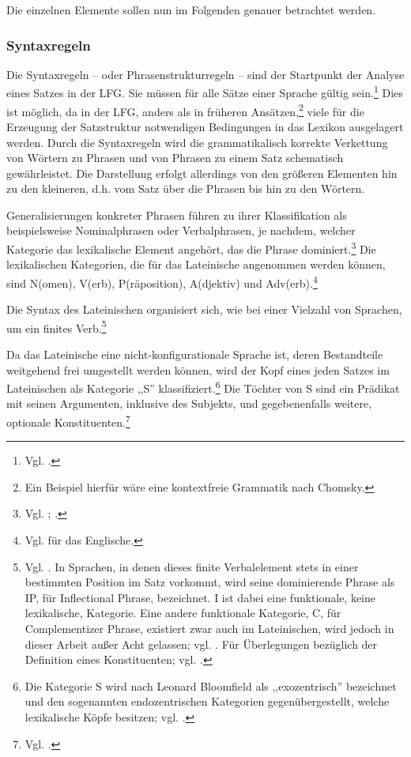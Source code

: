 \documentclass[12pt,a4paper]{article}
\begin{document}
Die einzelnen Elemente sollen nun im Folgenden genauer betrachtet werden.

\subsubsection{Syntaxregeln}
Die Syntaxregeln -- oder Phrasenstrukturregeln -- sind der Startpunkt der Analyse eines Satzes in der LFG. Sie müssen für alle Sätze einer Sprache gültig sein.\footnote{Vgl. \cite[47]{Dal}.} Dies ist möglich, da in der LFG, anders als in früheren Ansätzen,\footnote{Ein Beispiel hierfür wäre eine kontextfreie Grammatik nach Chomsky.} viele für die Erzeugung der Satzstruktur notwendigen Bedingungen in das Lexikon ausgelagert werden. Durch die Syntaxregeln wird die grammatikalisch korrekte Verkettung von Wörtern zu Phrasen und von Phrasen zu einem Satz schematisch gewährleistet. Die Darstellung erfolgt allerdings von den größeren Elementen hin zu den kleineren, d.h. vom Satz über die Phrasen bis hin zu den Wörtern.

Generalisierungen konkreter Phrasen führen zu ihrer Klassifikation als beispielsweise Nominalphrasen oder Verbalphrasen, je nachdem, welcher Kategorie das lexikalische Element angehört, das die Phrase dominiert.\footnote{Vgl. \cite[47; 53; 58-9]{Dal}; \cite[15]{Rohrer}.} Die lexikalischen Kategorien, die für das Lateinische angenommen werden können, sind N(omen), V(erb), P(räposition), A(djektiv) und Adv(erb).\footnote{Vgl. \cite[46; 52]{Dal} für das Englische.}

Die Syntax des Lateinischen organisiert sich, wie bei einer Vielzahl von Sprachen, um ein finites Verb.\footnote{Vgl. \cite[53]{Dal}. In Sprachen, in denen dieses finite Verbalelement stets in einer bestimmten Position im Satz vorkommt, wird seine dominierende Phrase als IP, für Inflectional Phrase, bezeichnet. I ist dabei eine funktionale, keine lexikalische, Kategorie. Eine andere funktionale Kategorie, C, für Complementizer Phrase, existiert zwar auch im Lateinischen, wird jedoch in dieser Arbeit außer Acht gelassen; vgl. \cite[46; 53; 63-5]{Dal}. Für Überlegungen bezüglich der Definition eines Konstituenten; vgl. \cite[48-9]{Dal}.}

Da das Lateinische eine nicht-konfigurationale Sprache ist, deren Bestandteile weitgehend frei umgestellt werden können, wird der Kopf eines jeden Satzes im Lateinischen als Kategorie ,,S'' klassifiziert.\footnote{Die Kategorie S wird nach Leonard Bloomfield als ,,exozentrisch'' bezeichnet und den sogenannten endozentrischen Kategorien gegenübergestellt, welche lexikalische Köpfe besitzen; vgl. \cite[46]{Dal}.} Die Töchter von S sind ein Prädikat mit seinen Argumenten, inklusive des Subjekts, und gegebenenfalls weitere, optionale Konstituenten.\footnote{Vgl. \cite[64-65]{Dal}.}
\end{document}
